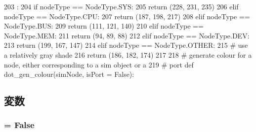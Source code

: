 \begin{DoxyCode}
203                              :
204     if nodeType == NodeType.SYS:
205         return (228, 231, 235)
206     elif nodeType == NodeType.CPU:
207         return (187, 198, 217)
208     elif nodeType == NodeType.BUS:
209         return (111, 121, 140)
210     elif nodeType == NodeType.MEM:
211         return (94, 89, 88)
212     elif nodeType == NodeType.DEV:
213         return (199, 167, 147)
214     elif nodeType == NodeType.OTHER:
215         # use a relatively gray shade
216         return (186, 182, 174)
217 
218 # generate colour for a node, either corresponding to a sim object or a
219 # port
def dot_gen_colour(simNode, isPort = False):
\end{DoxyCode}


\subsection{変数}
\hypertarget{namespacem5_1_1util_1_1dot__writer_a31241ceacc46b6932a85d676d5a4ab8a}{
\subsubsection[{pydot}]{ = False}}
\label{namespacem5_1_1util_1_1dot__writer_a31241ceacc46b6932a85d676d5a4ab8a}
